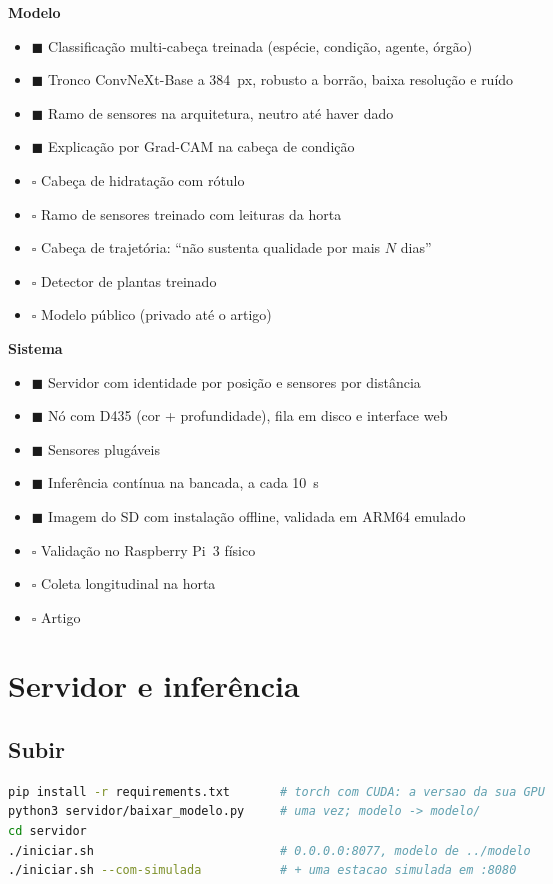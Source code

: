 \documentclass[11pt,a4paper]{article}
\newcommand{\feito}{\textcolor{verde}{$\blacksquare$}}
\newcommand{\falta}{\textcolor{cinza}{$\square$}}
\begin{document}
\newcommand{\estado}[2]{\item[#1] #2}
\begin{minipage}[t]{0.48\linewidth}
\textbf{Modelo}
\begin{itemize}[leftmargin=1.6em, labelsep=0.5em]
\estado{\feito}{Classificação multi-cabeça treinada (espécie, condição, agente, órgão)}
\estado{\feito}{Tronco ConvNeXt-Base a 384~px, robusto a borrão, baixa resolução e ruído}
\estado{\feito}{Ramo de sensores na arquitetura, neutro até haver dado}
\estado{\feito}{Explicação por Grad-CAM na cabeça de condição}
\estado{\falta}{Cabeça de hidratação com rótulo}
\estado{\falta}{Ramo de sensores treinado com leituras da horta}
\estado{\falta}{Cabeça de trajetória: ``não sustenta qualidade por mais $N$ dias''}
\estado{\falta}{Detector de plantas treinado}
\estado{\falta}{Modelo público (privado até o artigo)}
\end{itemize}
\end{minipage}\hfill
\begin{minipage}[t]{0.48\linewidth}
\textbf{Sistema}
\begin{itemize}[leftmargin=1.6em, labelsep=0.5em]
\estado{\feito}{Servidor com identidade por posição e sensores por distância}
\estado{\feito}{Nó com D435 (cor + profundidade), fila em disco e interface web}
\estado{\feito}{Sensores plugáveis}
\estado{\feito}{Inferência contínua na bancada, a cada 10~s}
\estado{\feito}{Imagem do SD com instalação offline, validada em ARM64 emulado}
\estado{\falta}{Validação no Raspberry Pi~3 físico}
\estado{\falta}{Coleta longitudinal na horta}
\estado{\falta}{Artigo}
\end{itemize}
\end{minipage}

\medskip
\noindent{\small\feito\ concluído \qquad \falta\ pendente}

\section{Servidor e inferência}

\subsection{Subir}
\begin{lstlisting}[language=bash]
pip install -r requirements.txt       # torch com CUDA: a versao da sua GPU
python3 servidor/baixar_modelo.py     # uma vez; modelo -> modelo/
cd servidor
./iniciar.sh                          # 0.0.0.0:8077, modelo de ../modelo
./iniciar.sh --com-simulada           # + uma estacao simulada em :8080
\end{lstlisting}
\end{document}
